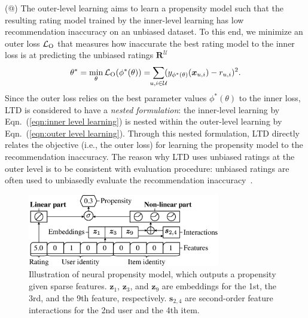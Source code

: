 \documentclass[letterpaper]{article} %
\makeatletter
\newcommand{\matrixize}[1]{\mathbf{#1}}
\newcommand{\vectorize}[1]{\bm{#1}}
\newcommand{\lrdense}[2]{\smashoperator[lr]{#1_{#2}}}
\newcommand{\obsUnbiasedPairs}{\mathcal{U}}
\newcommand{\trueRatings}{\matrixize{R}}
\newcommand{\biasedRating}{r_{u,i}}
\newcommand{\featureMark}{x}
\newcommand{\biasedFeatures}{\vectorize{\featureMark}_{u,i}}
\newcommand{\loss}[1]{\mathcal{L}_{\rm #1}}
\newcommand{\outerMark}{O}
\newcommand{\npEmbedding}{\vectorize{z}}
\newcommand{\npSecondOrder}{\vectorize{s}}
\newcommand{\ratingName}{y}
\newcommand{\ratingParam}{\phi}
\newcommand{\propensityParam}{\theta}
\newcommand*{\myroman}[1]{\expandafter\@slowromancap\romannumeral #1@}
\makeatother
\begin{document}
(\myroman{2}) The outer-level learning aims to learn a propensity model such that the resulting rating model trained by the inner-level learning has low recommendation inaccuracy on an unbiased dataset.
To this end, we minimize an outer loss $\loss{\outerMark}$ that measures how inaccurate the best rating model to the inner loss is at predicting the unbiased ratings $\trueRatings^\obsUnbiasedPairs$
\begin{equation}
\label{eqn:outer level learning}
\propensityParam^*
=\min_{\propensityParam}\loss{\outerMark}(\ratingParam^*(\propensityParam))
=\lrdense{\sum}{u,i\in\obsUnbiasedPairs}
(\ratingName_{\ratingParam^*(\propensityParam)}(\biasedFeatures)-\biasedRating)^2.
\end{equation}%
Since the outer loss relies on the best parameter values $\ratingParam^*(\propensityParam)$ to the inner loss, LTD is considered to have a \emph{nested formulation}: the inner-level learning by Eqn.~(\ref{eqn:inner level learning}) is nested within the outer-level learning by Eqn.~(\ref{eqn:outer level learning}).
Through this nested formulation, LTD directly relates the objective (i.e., the outer loss) for learning the propensity model to the recommendation inaccuracy.
The reason why LTD uses unbiased ratings at the outer level is to be consistent with evaluation procedure: unbiased ratings are often used to unbiasedly evaluate the recommendation inaccuracy~\cite{wang2019doubly}.

\begin{figure}[t]
\centering
\includegraphics[width=8.4cm]{fig/npm.eps}
\caption{
  Illustration of neural propensity model, which outputs a propensity given sparse features.
  $\npEmbedding_1$, $\npEmbedding_3$, and $\npEmbedding_9$ are embeddings for the 1st, the 3rd, and the 9th feature, respectively.
  $\npSecondOrder_{2,4}$ are second-order feature interactions for the 2nd user and the 4th item.
}
\label{fig:neural propensity model}
\end{figure}%
\end{document}
